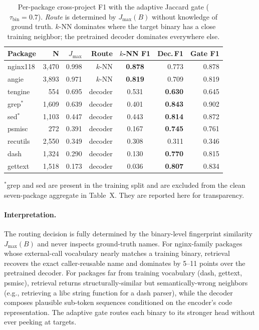 \begin{table}[t]
\centering
\small
\caption{Per-package cross-project F1 with the adaptive Jaccard gate ($\tau_{\text{bin}}{=}0.7$). \emph{Route} is determined by $J_{\max}(B)$ without knowledge of ground truth. $k$-NN dominates where the target binary has a close training neighbor; the pretrained decoder dominates everywhere else.}
\label{tab:route-vs-winner}
\begin{tabular}{lrrrcrr}
\toprule
Package     & N       & $J_{\max}$ & Route     & $k$-NN F1 & Dec.\,F1 & Gate F1 \\
\midrule
nginx118    & 3{,}470 & 0.998 & $k$-NN     & \textbf{0.878} & 0.773 & 0.878 \\
angie       & 3{,}893 & 0.971 & $k$-NN     & \textbf{0.819} & 0.709 & 0.819 \\
\midrule
tengine     &    554  & 0.695 & decoder    & 0.531          & \textbf{0.630} & 0.645 \\
grep$^*$    & 1{,}609 & 0.639 & decoder    & 0.401          & \textbf{0.843} & 0.902 \\
sed$^*$     & 1{,}103 & 0.447 & decoder    & 0.443          & \textbf{0.814} & 0.872 \\
psmisc      &    272  & 0.391 & decoder    & 0.167          & \textbf{0.745} & 0.761 \\
recutils    & 2{,}550 & 0.349 & decoder    & 0.308          & 0.311          & 0.346 \\
dash        & 1{,}324 & 0.290 & decoder    & 0.130          & \textbf{0.770} & 0.815 \\
gettext     & 1{,}518 & 0.173 & decoder    & 0.036          & \textbf{0.807} & 0.834 \\
\bottomrule
\end{tabular}

\raggedright
\footnotesize $^*$grep and sed are present in the training split and are excluded from the clean seven-package aggregate in Table~X. They are reported here for transparency.
\end{table}

\paragraph{Interpretation.}
The routing decision is fully determined by the binary-level fingerprint similarity $J_{\max}(B)$ and never inspects ground-truth names. For nginx-family packages whose external-call vocabulary nearly matches a training binary, retrieval recovers the exact caller-reusable name and dominates by 5--11 points over the pretrained decoder. For packages far from training vocabulary (dash, gettext, psmisc), retrieval returns structurally-similar but semantically-wrong neighbors (e.g., retrieving a libc string function for a dash parser), while the decoder composes plausible sub-token sequences conditioned on the encoder's code representation. The adaptive gate routes each binary to its stronger head without ever peeking at targets.

